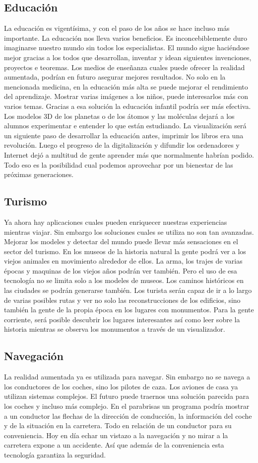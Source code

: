 \documentclass[a4paper,11pt]{scrartcl}
\begin{document}
 \subsection{Educación}
 La educación es vigentísima, y con el paso de los años se hace incluso más importante. La educación nos lleva varios beneficios. Es inconcebiblemente duro imaginarse nuestro mundo sin todos los especialistas. El mundo sigue haciéndose mejor gracias a los todos que desarrollan, inventar y idean siguientes invenciones, proyectos e teoremas. Los medios de enseñanza cuales puede ofrecer la realidad aumentada, podrían en futuro asegurar mejores resultados. No solo en la mencionada medicina, en la educación más alta se puede mejorar el rendimiento del aprendizaje. Mostrar varias imágenes a los niños, puede interesarlos más con varios temas. Gracias a esa solución la educación infantil podría ser más efectiva. Los modelos 3D de los planetas o de los átomos y las moléculas dejará a los alumnos experimentar e entender lo que están estudiando. La visualización será un siguiente paso de desarrollar la educación antes, imprimir los libros era una revolución. Luego el progreso de la digitalización y difundir los ordenadores y Internet dejó a multitud de gente aprender más que normalmente habrían podido. Todo eso es la posibilidad cual podemos aprovechar por un bienestar de las próximas generaciones.
 \subsection{Turismo}
 Ya ahora hay aplicaciones cuales pueden enriquecer nuestras experiencias mientras viajar. Sin embargo los soluciones cuales se utiliza no son tan avanzadas. Mejorar los modeles y detectar del mundo puede llevar más sensaciones en el sector del turismo. En los museos de la historia natural la gente podrá ver a los viejos animales en movimiento alrededor de ellos. La arma, los trajes de varias épocas y maquinas de los viejos años podrán ver también. Pero el uso de esa tecnología no se limita solo a los modeles de museos. Los caminos históricos en las ciudades se podrán generarse también. Los turista serán capaz de ir a lo largo de varias posibles rutas y ver no solo las reconstrucciones de los edificios, sino también la gente de la propia época en los lugares con monumentos. Para la gente corriente, será posible descubrir los lugares interesantes así como leer sobre la historia mientras se observa los monumentos a través de un visualizador.
 \subsection{Navegación}
 La realidad aumentada ya es utilizada para navegar. Sin embargo no se navega a los conductores de los coches, sino los pilotes de caza. Los aviones de casa ya utilizan sistemas complejos. El futuro puede traernos una solución parecida para los coches y incluso más complejo. En el parabrisas un programa podría mostrar a un conductor las flechas de la dirección de conducción, la información del coche y de la situación en la carretera. Todo en relación de un conductor para su conveniencia. Hoy en día echar un vistazo a la navegación y no mirar a la carretera expone a un accidente. Así que además de la conveniencia esta tecnología garantiza la seguridad.
\end{document}
